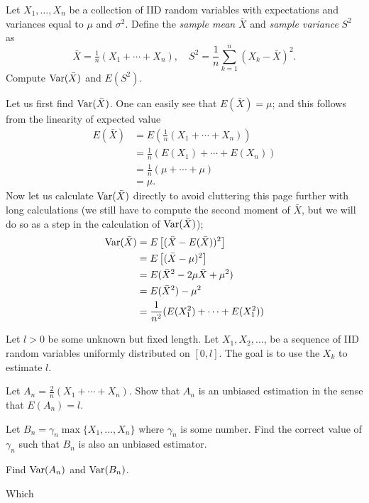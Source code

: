 \begin{problem}
  Let \(X_1,\dotsc,X_n\) be a collection of IID random variables with
  expectations and variances equal to \(\mu\) and \(\sigma^2\). Define the
  \emph{sample mean} \(\bar X\) and \emph{sample variance} \(S^2\) as
  \[
    \bar X=\tfrac{1}{n}(X_1+\dotsb+X_n),\quad
    S^2=\frac{1}{n}\sum_{k=1}^n(X_k-\bar X)^2.
  \]
  Compute \(\operatorname{Var}(\bar X)\) and \(E(S^2)\).
\end{problem}
\begin{solution*}
  Let us first find \(\operatorname{Var}(\bar X)\). One can easily see that \(E(\bar
  X)=\mu\); and this follows from the linearity of expected value
  \begin{align*}
    E(\bar X)
    &=E\left(\tfrac{1}{n}(X_1+\dotsb+X_n)\right)\\
    &=\tfrac{1}{n}(E(X_1)+\dotsb+E(X_n))\\
    &=\tfrac{1}{n}(\mu+\dotsb+\mu)\\
    &=\mu.
  \end{align*}
  Now let us calculate \(\operatorname{Var}(\bar X)\) directly to avoid cluttering this
  page further with long calculations (we still have to compute the second
  moment of \(\bar X\), but we will do so as a step in the calculation of
  \(\operatorname{Var}(\bar X)\));
  \begin{align*}
    \operatorname{Var}(\bar X)
    &=E\left[(\bar X-E(\bar X))^2\right]\\
    &=E\left[(\bar X-\mu)^2\right]\\
    &=E(\bar X^2-2\mu \bar X+\mu^2)\\
    &=E(\bar X^2)-\mu^2\\
    &=\frac{1}{n^2}(E(X_1^2)+\dotsb+E(X_1^2))
  \end{align*}
\end{solution*}

\begin{problem}
  Let \(l>0\) be some unknown but fixed length. Let \(X_1,X_2,\dotsc\), be
  a sequence of IID random variables uniformly distributed on
  \([0,l]\). The goal is to use the \(X_k\) to estimate \(l\).
  \begin{alphlist}
  \item Let \(A_n=\tfrac{2}{n}(X_1+\dotsb+X_n).\) Show that \(A_n\) is an
    unbiased estimation in the sense that \(E(A_n)=l\).
  \item Let \(B_n=\gamma_n\max\{X_1,\dotsc,X_n\}\) where \(\gamma_n\) is
    some number. Find the correct value of \(\gamma_n\) such that \(B_n\)
    is also an unbiased estimator.
  \item Find \(\operatorname{Var}(A_n)\) and \(\operatorname{Var}(B_n)\).
  \item Which
  \end{alphlist}
\end{problem}
\begin{solution*}
\end{solution*}

